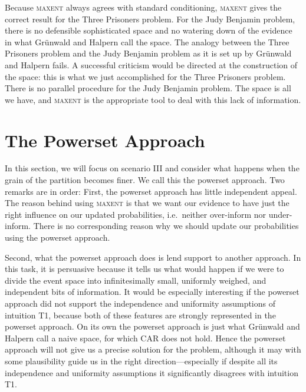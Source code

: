 \documentclass[12pt]{article}
\begin{document}
Because \textsc{maxent} always agrees with standard conditioning,
\textsc{maxent} gives the correct result for the Three Prisoners
problem. For the Judy Benjamin problem, there is no defensible
sophisticated space and no watering down of the evidence in what
Gr{\"u}nwald and Halpern call the  space. The analogy
between the Three Prisoners problem and the Judy Benjamin problem as
it is set up by Gr{\"u}nwald and Halpern fails. A successful criticism
would be directed at the construction of the  space: this
is what we just accomplished for the Three Prisoners problem. There is
no parallel procedure for the Judy Benjamin problem. The 
space is all we have, and \textsc{maxent} is the appropriate tool to
deal with this lack of information.

\section{The Powerset Approach}
\label{sec:4}

\nias In this section, we will focus on scenario III and consider what
happens when the grain of the partition becomes finer. We call this
the powerset approach. Two remarks are in order: First, the powerset
approach has little independent appeal. The reason behind using
\textsc{maxent} is that we want our evidence to have just the right
influence on our updated probabilities, i.e.\ neither over-inform
nor under-inform. There is no corresponding reason why we should
update our probabilities using the powerset approach.

Second, what the powerset approach does is lend support to another
approach. In this task, it is persuasive because it tells us what
would happen if we were to divide the event space into infinitesimally
small, uniformly weighed, and independent  bits of
information. It would be especially interesting if the powerset
approach did not support the independence and uniformity assumptions
of intuition T1, because both of these features are strongly
represented in the powerset approach. On its own the powerset approach
is just what Gr{\"u}nwald and Halpern call a naive space, for which
CAR does not hold. Hence the powerset approach will not give us a
precise solution for the problem, although it may with some
plausibility guide us in the right direction---especially if despite
all its independence and uniformity assumptions it significantly
disagrees with intuition T1.
\end{document}
